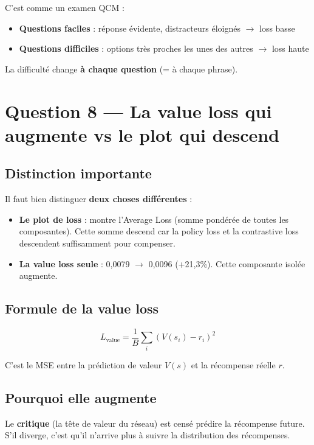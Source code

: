 \documentclass[11pt,a4paper]{article}
\begin{document}
C'est comme un examen QCM :
\begin{itemize}
    \item \textbf{Questions faciles} : réponse évidente, distracteurs éloignés $\rightarrow$ loss basse
    \item \textbf{Questions difficiles} : options très proches les unes des autres $\rightarrow$ loss haute
\end{itemize}

La difficulté change \textbf{à chaque question} (= à chaque phrase).

\section{Question 8 — La value loss qui augmente vs le plot qui descend}

\subsection{Distinction importante}

Il faut bien distinguer \textbf{deux choses différentes} :

\begin{itemize}
    \item \textbf{Le plot de loss} : montre l'Average Loss (somme pondérée de toutes les composantes). Cette somme descend car la policy loss et la contrastive loss descendent suffisamment pour compenser.
    
    \item \textbf{La value loss seule} : 0{,}0079 $\rightarrow$ 0{,}0096 (+21{,}3\%). Cette composante isolée augmente.
\end{itemize}

\subsection{Formule de la value loss}

\begin{equation}
L_{\text{value}} = \frac{1}{B}\sum_i (V(s_i) - r_i)^2
\end{equation}

C'est le MSE entre la prédiction de valeur $V(s)$ et la récompense réelle $r$.

\subsection{Pourquoi elle augmente}

Le \textbf{critique} (la tête de valeur du réseau) est censé prédire la récompense future. S'il diverge, c'est qu'il n'arrive plus à suivre la distribution des récompenses.
\end{document}
